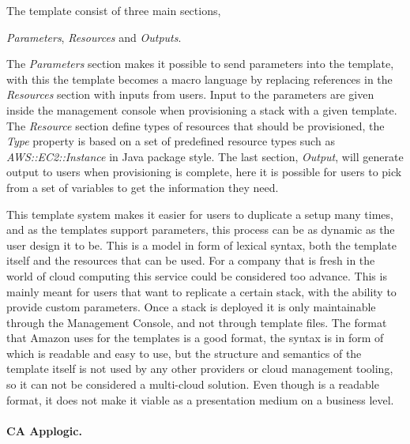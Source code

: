 The template consist of three main sections, 
\begin{ii}
  \iitem \emph{Parameters}, 
  \iitem \emph{Resources} and 
  \iitem \emph{Outputs}.
\end{ii}
The \emph{Parameters} section makes it possible to send parameters into the template, 
with this the template becomes a macro language by replacing 
references in the \emph{Resources} section with inputs from users. 
Input to the parameters are given inside the management console when 
provisioning a stack with a given template.
The \emph{Resource} section define types of resources that should be provisioned, the \emph{Type}
property is based on a set of predefined resource types such as \emph{AWS::EC2::Instance}
in Java package style.
The last section, \emph{Output}, will generate output to users when provisioning is complete,
here it is possible for users to pick from a set of variables to get the information they need.

This template system makes it easier for users to duplicate a setup many times, 
and as the templates support parameters,
this process can be as dynamic as the user design it to be. 
This is a model in form of lexical syntax, both the template itself 
and the resources that can be used.
For a company that is fresh in the world of cloud computing this service 
could be considered too advance. 
This is mainly meant for users that want to replicate a certain stack, 
with the ability to provide custom parameters. 
Once a stack is deployed it is only maintainable through the  Management Console, 
and not through template files. 
The format that Amazon uses for the templates is a good format, 
the syntax is in form of  which is readable and easy to use, 
but the structure and semantics of the template itself is not used by any 
other providers or cloud management tooling, 
so it can not be considered a multi-cloud solution. 
Even though  is a readable format, 
it does not make it viable as a presentation medium on a business level.

\paragraph{CA Applogic.}~\cite{applogic}



